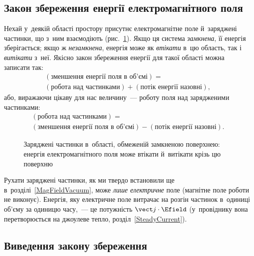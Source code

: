 \subsection*{Закон збереження енергії електромагнітного поля}


Нехай у~деякій області простору присутнє електромагнітне поле й~заряджені частинки, що
з~ним взаємодіють (рис.~\ref{pic:EnergyFlowRegion}). Якщо ця система \emph{замкнена}, її
енергія зберігається; якщо ж \emph{незамкнена}, енергія може як \emph{втікати} в~цю
область, так і \emph{витікати} з~неї. Якісно закон збереження енергії для такої області
можна записати так:
\begin{multline*}
	(\text{зменшення енергії поля в об'ємі}) = \\  (\text{робота над частинками}) + (\text{потік енергії назовні}),
\end{multline*}
або, виражаючи цікаву для нас величину~--- роботу поля над зарядженими частинками:
\begin{multline*}
	(\text{робота над частинками}) =  \\(\text{зменшення енергії поля в об'ємі}) - (\text{потік енергії назовні}).
\end{multline*}

\begin{figure}\centering
	\caption{Заряджені частинки в~області, обмеженій замкненою поверхнею: енергія
	електромагнітного поля може втікати й~витікати крізь цю
	поверхню\label{pic:EnergyFlowRegion}}
\end{figure}

Рухати заряджені частинки, як ми твердо встановили ще в~розділі~\ref{MagFieldVacuum}, може
\emph{лише електричне} поле (магнітне поле роботи не виконує). Енергія, яку електричне
поле витрачає на розгін частинок в~одиниці об'єму за одиницю часу,~--- це потужність
$\vect j\cdot\Efield$ (у~провіднику вона перетворюється на джоулеве тепло,
розділ~\ref{SteadyCurrent}).


\subsection*{Виведення закону збереження}


